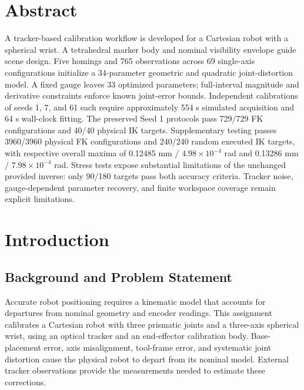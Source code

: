 \documentclass[11pt,letterpaper]{article}
\begin{document}
\section*{Abstract}
A tracker-based calibration workflow is developed for a Cartesian robot with a spherical wrist. A tetrahedral marker body and nominal visibility envelope guide scene design. Five homings and 765 observations across 69 single-axis configurations initialize a 34-parameter geometric and quadratic joint-distortion model. A fixed gauge leaves 33 optimized parameters; full-interval magnitude and derivative constraints enforce known joint-error bounds. Independent calibrations of seeds 1, 7, and 61 each require approximately 554 s simulated acquisition and 64 s wall-clock fitting. The preserved Seed 1 protocols pass 729/729 FK configurations and 40/40 physical IK targets. Supplementary testing passes 3960/3960 physical FK configurations and 240/240 random executed IK targets, with respective overall maxima of 0.12485 mm / $4.98\times10^{-4}$ rad and 0.13286 mm / $7.98\times10^{-4}$ rad. Stress tests expose substantial limitations of the unchanged provided inverse: only 90/180 targets pass both accuracy criteria. Tracker noise, gauge-dependent parameter recovery, and finite workspace coverage remain explicit limitations.

\setcounter{tocdepth}{1}
\tableofcontents
\clearpage
\hypersetup{pageanchor=true}

\section{Introduction}\label{sec:introduction}
\subsection{Background and Problem Statement}
Accurate robot positioning requires a kinematic model that accounts for departures from nominal geometry and encoder readings. This assignment calibrates a Cartesian robot with three prismatic joints and a three-axis spherical wrist, using an optical tracker and an end-effector calibration body. Base-placement error, axis misalignment, tool-frame error, and systematic joint distortion cause the physical robot to depart from its nominal model. External tracker observations provide the measurements needed to estimate these corrections.
\end{document}
